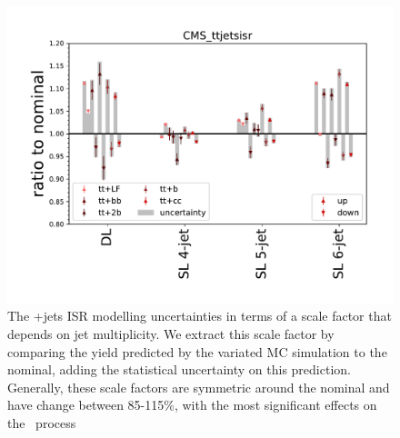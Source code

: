 \begin{figure}
\begin{centering}
\includegraphics[width=1.0\textwidth]{figures/tth/CMS_ttjetsisr.pdf}
\caption[The \ttbar+jets ISR modelling uncertainties]{The \ttbar+jets ISR modelling uncertainties in terms of a scale factor that depends on jet multiplicity. We extract this scale factor by comparing the yield predicted by the variated MC simulation to the nominal, adding the statistical uncertainty on this prediction. Generally, these scale factors are symmetric around the nominal and have change between 85-115\%, with the most significant effects on the \ttlf~process}
\label{fig:tth_ttjets_modelling}
\end{centering}
\end{figure}

